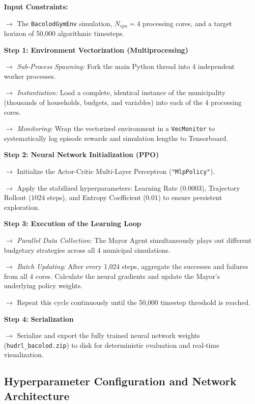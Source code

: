 \vspace{0.5cm} 
\begin{algorithm}[H]
\caption{The Multi-Core DRL Training Pipeline}
\label{alg:drl_training_english}
\begin{algorithmic}[1]
\State \textbf{Input Constraints:} 
\State \parbox[t]{0.9\linewidth}{$\rightarrow$ The \texttt{BacolodGymEnv} simulation, $N_{cpu} = 4$ processing cores, and a target horizon of 50,000 algorithmic timesteps.\strut}
\Statex
\State \textbf{Step 1: Environment Vectorization (Multiprocessing)}
\State \parbox[t]{0.9\linewidth}{$\rightarrow$ \textit{Sub-Process Spawning:} Fork the main Python thread into 4 independent worker processes.\strut}
\State \parbox[t]{0.9\linewidth}{$\rightarrow$ \textit{Instantiation:} Load a complete, identical instance of the municipality (thousands of households, budgets, and variables) into each of the 4 processing cores.\strut}
\State \parbox[t]{0.9\linewidth}{$\rightarrow$ \textit{Monitoring:} Wrap the vectorized environment in a \texttt{VecMonitor} to systematically log episode rewards and simulation lengths to Tensorboard.\strut}
\Statex
\State \textbf{Step 2: Neural Network Initialization (PPO)}
\State \parbox[t]{0.9\linewidth}{$\rightarrow$ Initialize the Actor-Critic Multi-Layer Perceptron (\texttt{"MlpPolicy"}).\strut}
\State \parbox[t]{0.9\linewidth}{$\rightarrow$ Apply the stabilized hyperparameters: Learning Rate ($0.0003$), Trajectory Rollout ($1024$ steps), and Entropy Coefficient ($0.01$) to ensure persistent exploration.\strut}
\Statex
\State \textbf{Step 3: Execution of the Learning Loop}
\State \parbox[t]{0.9\linewidth}{$\rightarrow$ \textit{Parallel Data Collection:} The Mayor Agent simultaneously plays out different budgetary strategies across all 4 municipal simulations.\strut}
\State \parbox[t]{0.9\linewidth}{$\rightarrow$ \textit{Batch Updating:} After every 1,024 steps, aggregate the successes and failures from all 4 cores. Calculate the neural gradients and update the Mayor's underlying policy weights.\strut}
\State \parbox[t]{0.9\linewidth}{$\rightarrow$ Repeat this cycle continuously until the 50,000 timestep threshold is reached.\strut}
\Statex
\State \textbf{Step 4: Serialization}
\State \parbox[t]{0.9\linewidth}{$\rightarrow$ Serialize and export the fully trained neural network weights (\texttt{hudrl\_bacolod.zip}) to disk for deterministic evaluation and real-time visualization.\strut}
\end{algorithmic}
\end{algorithm}

\subsection{Hyperparameter Configuration and Network Architecture}

